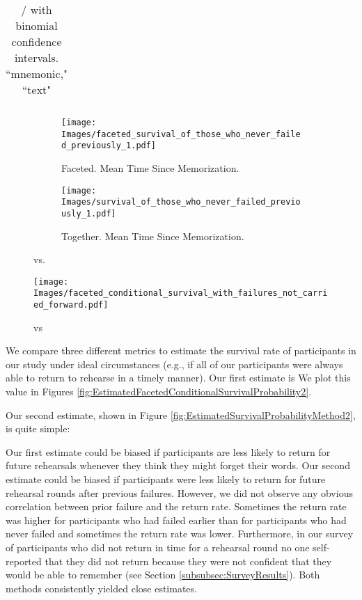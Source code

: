 \begin{table}[t]
{\begin{tabular}{|p{1.9cm}||p{0.5cm}|p{1.05cm}|p{1.05cm}|p{1.05cm}|p{1.05cm}|}
 \hline
\end{tabular}}
\caption{/ with  binomial confidence intervals.  ``mnemonic," ``text"}
\label{tab:survived}
\end{table}

\begin{figure}[tb]
\centering
\begin{subfigure}[b]{0.45 \textwidth}
\texttt{[image: Images/faceted\_survival\_of\_those\_who\_never\_failed\_previously\_1.pdf]}
\caption{Faceted. Mean Time Since Memorization.}
\label{fig:FacetedConditionalSurvivalProbability}
\end{subfigure}
\begin{subfigure}[b]{0.45 \textwidth}
\centering
\texttt{[image: Images/survival\_of\_those\_who\_never\_failed\_previously\_1.pdf]}

\caption{Together. Mean Time Since Memorization. }
\label{fig:ConditionalSurvivalProbability}
\end{subfigure}
\caption{ vs.  }
\end{figure}

\begin{figure}[tb]
\centering
\texttt{[image: Images/faceted\_conditional\_survival\_with\_failures\_not\_carried\_forward.pdf]}
\caption{ vs }
\label{fig:ConditionalSuccessMethod2}
\end{figure}

We compare three different metrics to estimate the survival rate of participants in our study under ideal circumstances (e.g., if all of our participants were always able to return to rehearse in a timely manner). Our first estimate is    We plot this value in Figures \ref{fig:EstimatedFacetedConditionalSurvivalProbability2}. 

Our second estimate, shown in Figure \ref{fig:EstimatedSurvivalProbabilityMethod2}, is quite simple:  

Our first estimate could be biased if participants are less likely to return for future rehearsals whenever they think they might forget their words. Our second estimate could be biased if participants were less likely to return for future rehearsal rounds after previous failures. However, we did not observe any obvious correlation between prior failure and the return rate. Sometimes the return rate was higher for participants who had failed earlier than for participants who had never failed and sometimes the return rate was lower. Furthermore, in our survey of participants who did not return in time for a rehearsal round no one self-reported that they did not return because they were not confident that they would be able to remember (see Section \ref{subsubsec:SurveyResults}). Both methods consistently yielded close estimates. 

